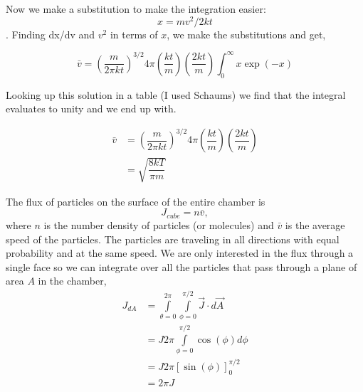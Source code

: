 \documentclass[12pt]{article}
\renewcommand{\=}[1]{\stackrel{#1}{=}} %
\theoremstyle{definition}
\theoremstyle{remark}
\begin{document}
Now we make a substitution to make the integration easier: $$x = mv^2/2kt$$. Finding dx/dv and $v^2$ in terms of $x$,  we make the substitutions and get,

\[
	\bar{v} = \left(\dfrac{m}{2\pi kt}\right)^{3/2} 4\pi\left(\dfrac{kt}{m}\right) \left(\dfrac{2kt}{m}\right) \int_{0}^{\infty} x \exp{\left(-x\right)}
\]

Looking up this solution in a table (I used Schaums) we find that the integral evaluates to unity and we end up with.

\begin{align*}
	\bar{v} &=  \left(\dfrac{m}{2\pi kt}\right)^{3/2} 4\pi\left(\dfrac{kt}{m}\right) \left(\dfrac{2kt}{m}\right)\\[3mm]
		&= \sqrt{\dfrac{8kT}{\pi m}}
\end{align*}
	
The flux of particles on the surface of the entire chamber is
\[
 J_{cube} = n\bar{v},
\]
where $n$ is the number density of particles (or molecules) and $\bar{v}$ is the average speed of the particles. The particles are traveling in all directions with equal probability and at the same speed. We are only interested in the flux through a single face so we  can integrate over all the particles that pass through a plane of area $A$ in the chamber,
\begin{align*}
	J_{dA} &= \int\limits_{\theta = 0}^{2\pi} \int\limits_{\phi = 0}^{\pi/2} \vec{J}\cdot d\vec{A}\\[3mm]
		&= J2\pi \int\limits_{\phi = 0}^{\pi/2}\cos(\phi)d\phi\\[3mm]
		&= J2\pi \left[\sin(\phi)\right]_{0}^{\pi/2}\\[3mm]
		&= 2\pi J 
\end{align*}
\end{document}
